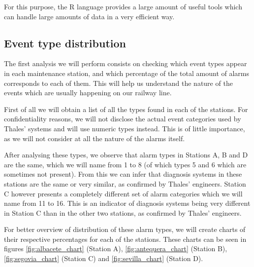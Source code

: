 For this purpose, the R language provides a large amount of useful tools which can handle large amounts of data in a very efficient way\cite{quick2010statistical}.

\subsection{Event type distribution}
The first analysis we will perform consists on checking which event types appear in each maintenance station, and which percentage of the total amount of alarms corresponds to each of them. This will help us understand the nature of the events which are usually happening on our railway line.

First of all we will obtain a list of all the types found in each of the stations. For confidentiality reasons, we will not disclose the actual event categories used by Thales' systems and will use numeric types instead. This is of little importance, as we will not consider at all the nature of the alarms itself.

After analysing these types, we observe that alarm types in Stations A, B and D are the same, which we will name from 1 to 8 (of which types 5 and 6 which are sometimes not present). From this we can infer that diagnosis systems in these stations are the same or very similar, as confirmed by Thales' engineers. Station C however presents a completely different set of alarm categories which we will name from 11 to 16. This is an indicator of diagnosis systems being very different in Station C than in the other two stations, as confirmed by Thales' engineers.

For better overview of distribution of these alarm types, we will create charts of their respective percentages for each of the stations. These charts can be seen in figures \ref{fig:albacete_chart} (Station A), \ref{fig:antequera_chart} (Station B), \ref{fig:segovia_chart} (Station C) and \ref{fig:sevilla_chart} (Station D).

